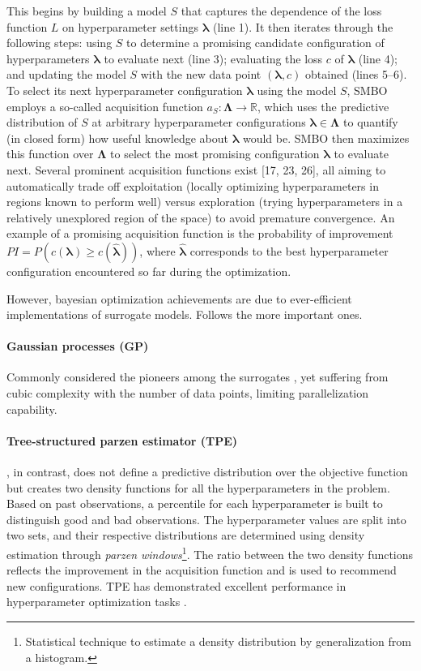 \noindent This begins by building a model $S$ that captures the dependence of the loss function $L$ on hyperparameter settings $\pmb{\lambda}$ (line 1).
It then iterates through the following steps: using $S$ to determine a promising candidate configuration of hyperparameters $\pmb{\lambda}$ to evaluate next (line 3); evaluating the loss $c$ of $\pmb{\lambda}$ (line 4); and updating the model $S$ with the new data point $(\pmb{\lambda}, c)$ obtained (lines 5–6).
To select its next hyperparameter configuration $\pmb{\lambda}$ using the model $S$, SMBO employs a so-called acquisition function $a_{S} : \pmb{\Lambda} \rightarrow \mathbb{R}$, which uses the predictive distribution of $S$ at arbitrary hyperparameter configurations $\pmb{\lambda} \in \pmb{\Lambda}$ to quantify (in closed form) how useful knowledge about $\pmb{\lambda}$ would be.
SMBO then maximizes this function over $\pmb{\Lambda}$ to select the most promising configuration $\pmb{\lambda}$ to evaluate next.
Several prominent acquisition functions exist [17, 23, 26], all aiming to automatically trade off exploitation (locally optimizing hyperparameters in regions known to perform well) versus exploration (trying hyperparameters in a relatively unexplored region of the space) to avoid premature convergence.
An example of a promising acquisition function is the probability of improvement $PI = P(c(\pmb{\lambda}) \ge c(\hat{\pmb{\lambda}}))$, where $\hat{\pmb{\lambda}}$ corresponds to the best hyperparameter configuration encountered so far during the optimization.

However, bayesian optimization achievements are due to ever-efficient implementations of surrogate models.
Follows the more important ones.

\paragraph{Gaussian processes (GP)} Commonly considered the pioneers among the surrogates \cite{112, 80}, yet suffering from cubic complexity with the number of data points, limiting parallelization capability.

\paragraph{Tree-structured parzen estimator (TPE)} \cite{13}, in contrast, does not define a predictive distribution over the objective function but creates two density functions for all the hyperparameters in the problem.
Based on past observations, a percentile for each hyperparameter is built to distinguish good and bad observations.
The hyperparameter values are split into two sets, and their respective distributions are determined using density estimation through \textit{parzen windows}\footnote{Statistical technique to estimate a density distribution by generalization from a histogram.}.
The ratio between the two density functions reflects the improvement in the acquisition function and is used to recommend new configurations.
TPE has demonstrated excellent performance in hyperparameter optimization tasks \cite{13, 12, 35, 37, 115}.

